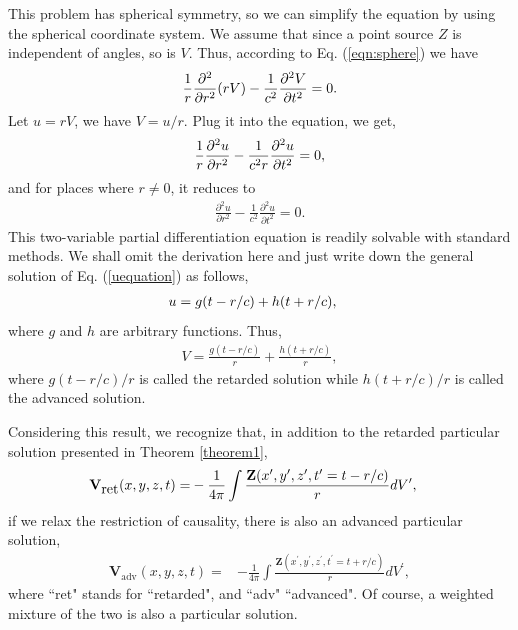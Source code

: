 \documentclass[11pt]{article}              %
\begin{document}
This problem has spherical symmetry, so we can simplify the equation by using the spherical coordinate system. We assume that since a point source $Z$ is independent of angles, so is $V$. Thus, according to Eq. (\ref{eqn:sphere}) we have
\begin{equation}
    \frac{1}{r}\frac{\partial^2}{\partial r^2}(rV)-\frac{1}{c^2}\frac{\partial^2 V}{\partial t^2}=0.\notag
\end{equation}
Let $u=rV$, we have $V=u/r$. Plug it into the equation, we get,
\begin{align}
    \frac{1}{r}\frac{\partial^2 u}{\partial r^2}-\frac{1}{c^2r}\frac{\partial^2 u}{\partial t^2}=0,\notag
\end{align}
and for places where $r\neq 0$, it reduces to 
\begin{align}
    \frac{\partial^2 u}{\partial r^2}-\frac{1}{c^2}\frac{\partial^2 u}{\partial t^2}=0.\label{uequation}
\end{align}
This two-variable partial differentiation equation is readily solvable with standard methods. We shall omit the derivation here and just write down the general solution of Eq. (\ref{uequation}) as follows,
\begin{align}
    u&=g(t-r/c)+h(t+r/c),\notag
\end{align}
where $g$ and $h$ are arbitrary functions. Thus,
\begin{align}
    V=\frac{g(t-r/c)}{r}+\frac{h(t+r/c)}{r},
\end{align}
where $g(t-r/c)/r$ is called the retarded solution while $h(t+r/c)/r$ is called the advanced solution.


Considering this result, we recognize that, in addition to the retarded particular solution presented in Theorem \ref{theorem1}, 
\begin{align}
		{\mathbf V}_{\mbox{ret}}(x,y,z,t)
		=&-\frac{1}{4\pi}\int \frac{{\mathbf Z}(x^\prime,y^\prime,z^\prime,t^\prime=t-r/c)}{r}dV^\prime,\notag
\end{align}
if we relax the restriction of causality, there is also an advanced particular solution,
\begin{align}
		{\mathbf V}_{\mbox{adv}}(x,y,z,t)
		=&-\frac{1}{4\pi}\int \frac{{\mathbf Z}(x^\prime,y^\prime,z^\prime,t^\prime=t+r/c)}{r}dV^\prime,\label{eqn:advsolution}
\end{align}
where ``ret" stands for ``retarded", and ``adv" ``advanced". Of course, a weighted mixture of the two is also a particular solution. 
\end{document}
